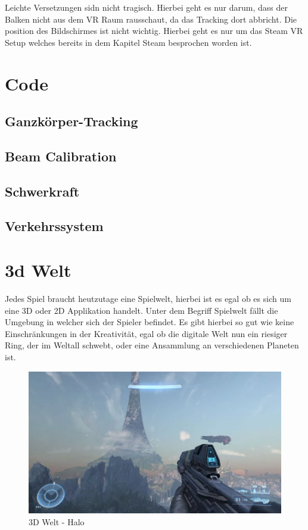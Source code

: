 Leichte Versetzungen sidn nicht tragisch. Hierbei geht es nur darum, dass der Balken nicht aus dem VR Raum
rausschaut, da das Tracking dort abbricht. Die position des Bildschirmes ist nicht wichtig.
Hierbei geht es nur um das Steam VR Setup welches bereits in dem Kapitel Steam besprochen worden ist.

\section{Code}\label{sec:code}
\subsection{Ganzkörper-Tracking}\label{sec:full-body-tracking}
\subsection{Beam Calibration}\label{subsec:beam-calibration}
\subsection{Schwerkraft}\label{subsec:gravity}
\subsection{Verkehrssystem}\label{subsec:traffic-system}


\section{3d Welt}\label{sec:3d-world}
Jedes Spiel braucht heutzutage eine Spielwelt, hierbei ist es egal ob es sich um eine 3D oder 2D Applikation handelt.
Unter dem Begriff Spielwelt fällt die Umgebung in welcher sich der Spieler befindet.
Es gibt hierbei so gut wie keine Einschränkungen in der Kreativität, egal ob die digitale Welt nun ein riesiger Ring, der im Weltall schwebt,
oder eine Ansammlung an verschiedenen Planeten ist.
~\cite{GamesRadar_HaloRing_2022}

\begin {figure}
    \includegraphics[scale=0.18]{pics/3d_welt_halo_ring}
    \caption{3D Welt - Halo}
    \label{fig:3d_environment_halo}
\end {figure}

